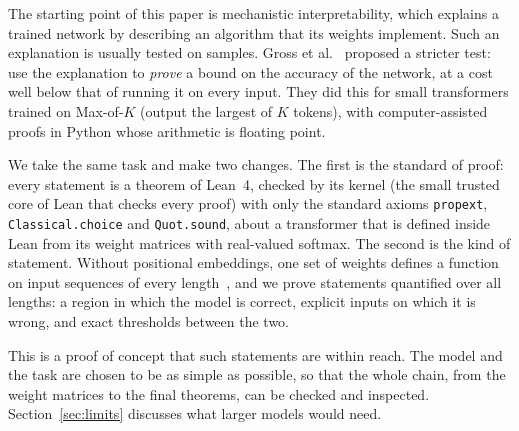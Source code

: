 \documentclass[11pt,a4paper]{article}
\newcommand{\lean}[1]{\texttt{#1}}
\begin{document}
The starting point of this paper is mechanistic interpretability, which
explains a trained network by describing an algorithm that its weights
implement. Such an explanation is usually tested on samples. Gross et
al.~\cite{gross2024compact} proposed a stricter test: use the explanation to
\emph{prove} a bound on the accuracy of the network, at a cost well below that
of running it on every input. They did this for small transformers trained on
Max-of-$K$ (output the largest of $K$ tokens), with computer-assisted proofs in
Python whose arithmetic is floating point.

We take the same task and make two changes. The first is the standard of proof:
every statement is a theorem of Lean~4, checked by its kernel (the small trusted
core of Lean that checks every proof) with only the standard axioms
\lean{propext}, \lean{Classical.choice} and \lean{Quot.sound}, about a
transformer that is defined inside Lean from its weight matrices with
real-valued softmax. The second is the kind of statement. Without positional
embeddings, one set of weights defines a function on input sequences of every
length~\cite{kazemnejad2023nope}, and we prove statements quantified over all
lengths: a region in which the model is correct, explicit inputs on which it is
wrong, and exact thresholds between the two.

This is a proof of concept that such statements are within reach. The model and
the task are chosen to be as simple as possible, so that the whole chain, from
the weight matrices to the final theorems, can be checked and inspected.
Section~\ref{sec:limits} discusses what larger models would need.
\end{document}
